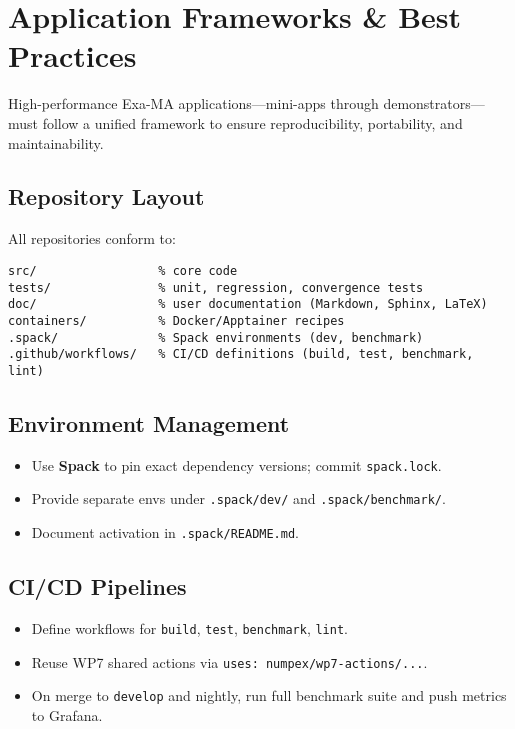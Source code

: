 
\section{Application Frameworks \& Best Practices}
\label{sec:apps-framework}

High-performance Exa-MA applications—mini-apps through demonstrators—must follow a unified framework to ensure reproducibility, portability, and maintainability.

\subsection{Repository Layout}
All repositories conform to:
\begin{verbatim}
src/                 % core code
tests/               % unit, regression, convergence tests
doc/                 % user documentation (Markdown, Sphinx, LaTeX)
containers/          % Docker/Apptainer recipes
.spack/              % Spack environments (dev, benchmark)
.github/workflows/   % CI/CD definitions (build, test, benchmark, lint)
\end{verbatim}

\subsection{Environment Management}
\begin{itemize}
  \item Use \textbf{Spack} to pin exact dependency versions; commit \texttt{spack.lock}.
  \item Provide separate envs under \texttt{.spack/dev/} and \texttt{.spack/benchmark/}.
  \item Document activation in \texttt{.spack/README.md}.
\end{itemize}

\subsection{CI/CD Pipelines}
\begin{itemize}
  \item Define workflows for \texttt{build}, \texttt{test}, \texttt{benchmark}, \texttt{lint}.
  \item Reuse WP7 shared actions via \texttt{uses: numpex/wp7-actions/...}.
  \item On merge to \texttt{develop} and nightly, run full benchmark suite and push metrics to Grafana.
\end{itemize}


